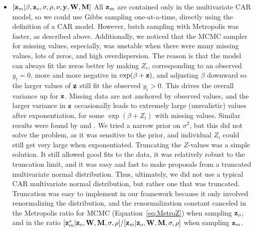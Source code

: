 \documentclass[11pt, titlepage]{article}
\begin{document}
\begin{spacing}{1.9}
\begin{flushleft}
\begin{itemize}
  \item $[\mathbf{z}_{m}|\beta,\mathbf{z}_{o},\sigma,\rho,\nu,\mathbf{y},\mathbf{W},\mathbf{M}]$ All $\mathbf{z}_{m}$ are contained only in the multivariate CAR model, so we could use Gibbs sampling one-at-a-time, directly using the definition of a CAR model. However, batch sampling with Metropolis was faster, as described above.  Additionally, we noticed that the MCMC sampler for missing values, especially, was unstable when there were many missing values, lots of zeros, and high overdispersion.  The reason is that the model can always fit the zeros better by making $Z_{i}$, corresponding to an observed $y_{i} = 0$, more and more negative in $\exp(\beta + \mathbf{z})$, and adjusting $\beta$ downward so the larger values of $\mathbf{z}$ still fit the observed $y_{i} > 0$.  This drives the overall variance up for $\mathbf{z}$.  Missing data are not anchored by observed values, and the larger variance in $\mathbf{z}$ occasionally leads to extremely large (unrealistic) values after exponentiation, for some $\exp(\beta + Z_{i})$ with missing values.  Similar results were found by \citet{conn_using_2015} and \citet{higham_spatial_2019}. We tried a narrow prior on $\sigma^{2}$, but this did not solve the problem, as it was sensitive to the prior, and individual $Z_{i}$ could still get very large when exponentiated.  Truncating the $Z$-values was a simple solution.  It still allowed good fits to the data, it was relatively robust to the truncation limit, and it was easy and fast to make proposals from a truncated multivariate normal distribution.  Thus, ultimately, we did not use a typical CAR multivariate normal distribution, but rather one that was truncated.  Truncation was easy to implement in our framework because it only involved renormalizing the distribution, and the renormalization constant canceled in the Metropolis ratio for MCMC (Equation~\ref{eq:MetroZ}) when sampling $\mathbf{z}_{o}$, and in the ratio $[\mathbf{z}_{m}^{*}|\mathbf{z}_{o},\mathbf{W},\mathbf{M},\sigma,\rho]/[\mathbf{z}_{m}|\mathbf{z}_{o},\mathbf{W},\mathbf{M},\sigma,\rho]$ when sampling $\mathbf{z}_{m}$.

\end{itemize}
\end{flushleft}
\end{spacing}
\end{document}
